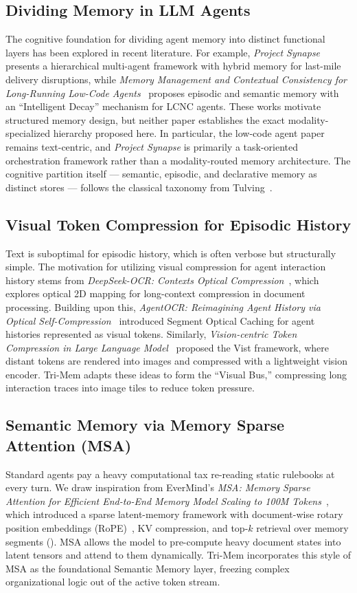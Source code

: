 \documentclass[conference]{IEEEtran}
\begin{document}
\subsection{Dividing Memory in LLM Agents}
The cognitive foundation for dividing agent memory into distinct functional layers has been explored in recent literature. For example, \textit{Project Synapse}~\cite{synapse2026} presents a hierarchical multi-agent framework with hybrid memory for last-mile delivery disruptions, while \textit{Memory Management and Contextual Consistency for Long-Running Low-Code Agents}~\cite{lowcode2025} proposes episodic and semantic memory with an ``Intelligent Decay'' mechanism for LCNC agents. These works motivate structured memory design, but neither paper establishes the exact modality-specialized hierarchy proposed here. In particular, the low-code agent paper remains text-centric, and \textit{Project Synapse} is primarily a task-oriented orchestration framework rather than a modality-routed memory architecture. The cognitive partition itself --- semantic, episodic, and declarative memory as distinct stores --- follows the classical taxonomy from Tulving~\cite{tulving1972}.

\subsection{Visual Token Compression for Episodic History}
Text is suboptimal for episodic history, which is often verbose but structurally simple. The motivation for utilizing visual compression for agent interaction history stems from \textit{DeepSeek-OCR: Contexts Optical Compression}~\cite{deepseekocr}, which explores optical 2D mapping for long-context compression in document processing. Building upon this, \textit{AgentOCR: Reimagining Agent History via Optical Self-Compression}~\cite{agentocr2026} introduced Segment Optical Caching for agent histories represented as visual tokens. Similarly, \textit{Vision-centric Token Compression in Large Language Model}~\cite{vist2025} proposed the Vist framework, where distant tokens are rendered into images and compressed with a lightweight vision encoder. Tri-Mem adapts these ideas to form the ``Visual Bus,'' compressing long interaction traces into image tiles to reduce token pressure.

\subsection{Semantic Memory via Memory Sparse Attention (MSA)}
Standard agents pay a heavy computational tax re-reading static rulebooks at every turn. We draw inspiration from EverMind's \textit{MSA: Memory Sparse Attention for Efficient End-to-End Memory Model Scaling to 100M Tokens}~\cite{evermind2026}, which introduced a sparse latent-memory framework with document-wise rotary position embeddings (RoPE)~\cite{rope2021}, KV compression, and top-$k$ retrieval over memory segments (\cite[\S 3]{evermind2026}). MSA allows the model to pre-compute heavy document states into latent tensors and attend to them dynamically. Tri-Mem incorporates this style of MSA as the foundational Semantic Memory layer, freezing complex organizational logic out of the active token stream.
\end{document}
